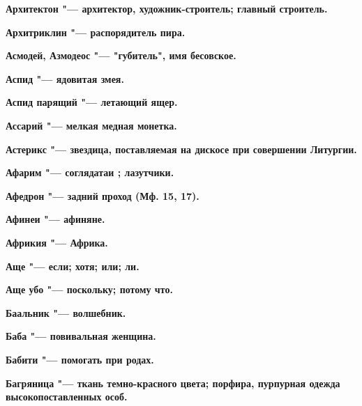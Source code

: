 \bfseries Архитектон \normalfont{} "--- архитектор, художник-строитель; главный строитель. 




\bfseries Архитриклин \normalfont{} "--- распорядитель пира. 




\bfseries Асмодей, Азмодеос \normalfont{} "--- "губитель", имя бесовское. 




\bfseries Аспид \normalfont{} "--- ядовитая змея. 




\bfseries Аспид парящий \normalfont{} "--- летающий ящер. 




\bfseries Ассарий \normalfont{} "--- мелкая медная монетка. 




\bfseries Астерикс \normalfont{} "--- звездица, поставляемая на дискосе при совершении Литургии. 




\bfseries Афарим \normalfont{} "--- соглядатаи ; лазутчики. 




\bfseries Афедрон \normalfont{} "--- задний проход (Мф. 15, 17). 




\bfseries Афинеи \normalfont{} "--- афиняне. 




\bfseries Африкия \normalfont{} "--- Африка. 




\bfseries Аще \normalfont{} "--- если; хотя; или; ли. 




\bfseries Аще убо \normalfont{} "--- поскольку; потому что. 




 





\bfseries Баальник \normalfont{} "--- волшебник. 




\bfseries Баба \normalfont{} "--- повивальная женщина. 




\bfseries Бабити \normalfont{} "--- помогать при родах. 




\bfseries Багряница \normalfont{} "--- ткань темно-красного цвета; порфира, пурпурная одежда высокопоставленных особ. 




